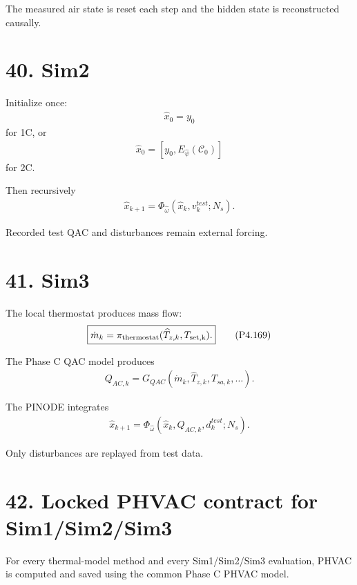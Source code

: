 \documentclass[11pt]{article}
\begin{document}
The measured air state is reset each step and the hidden state is reconstructed causally.

\section*{40. Sim2}

Initialize once:
\begin{align}
\boxed{\widehat x_0=y_0}
\tag{P4.166}
\end{align}
for 1C, or
\begin{align}
\boxed{
\widehat x_0=[y_0,E_{\widehat\psi}(\mathcal C_0)]
}
\tag{P4.167}
\end{align}
for 2C.

Then recursively
\begin{align}
\boxed{
\widehat x_{k+1}
=
\Phi_{\widehat\omega}
(\widehat x_k,v_k^{test};N_s).
}
\tag{P4.168}
\end{align}

Recorded test QAC and disturbances remain external forcing.

\section*{41. Sim3}

The local thermostat produces mass flow:
\begin{align}
\boxed{
\dot m_k
=
\pi_{\rm thermostat}
(\widehat T_{z,k},T_{\rm set,k}).
}
\tag{P4.169}
\end{align}

The Phase C QAC model produces
\begin{align}
\boxed{
Q_{AC,k}
=
G_{QAC}
(\dot m_k,\widehat T_{z,k},T_{sa,k},\ldots).
}
\tag{P4.170}
\end{align}

The PINODE integrates
\begin{align}
\boxed{
\widehat x_{k+1}
=
\Phi_{\widehat\omega}
(\widehat x_k,Q_{AC,k},d_k^{test};N_s).
}
\tag{P4.171}
\end{align}

Only disturbances are replayed from test data.

\section*{42. Locked PHVAC contract for Sim1/Sim2/Sim3}

For every thermal-model method and every Sim1/Sim2/Sim3 evaluation, PHVAC is computed and saved using the common Phase C PHVAC model.
\end{document}
